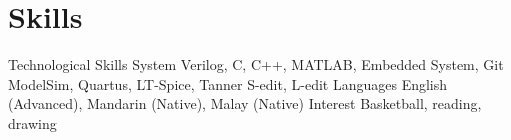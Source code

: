 \documentclass{myresume}
\begin{document}
\section{Skills~\hrulefill}
%
\cvEntryTwo
{Technological Skills}
{}
{System Verilog, C, C++, MATLAB, Embedded System, Git\newline
ModelSim, Quartus, LT-Spice, Tanner S-edit, L-edit\newline}
%
\cvEntryTwo
{Languages}
{}
{English (Advanced), Mandarin (Native), Malay (Native)\newline}
%
\cvEntryTwo
{Interest}
{}
{Basketball, reading, drawing}
\end{document}
